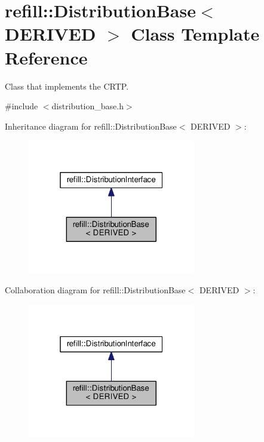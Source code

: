 \hypertarget{classrefill_1_1DistributionBase}{}\section{refill\+:\+:Distribution\+Base$<$ D\+E\+R\+I\+V\+ED $>$ Class Template Reference}
\label{classrefill_1_1DistributionBase}


Class that implements the C\+R\+TP.  




{\ttfamily \#include $<$distribution\+\_\+base.\+h$>$}



Inheritance diagram for refill\+:\+:Distribution\+Base$<$ D\+E\+R\+I\+V\+ED $>$\+:\nopagebreak
\begin{figure}[H]
\begin{center}
\leavevmode
\includegraphics[width=208pt]{classrefill_1_1DistributionBase__inherit__graph}
\end{center}
\end{figure}


Collaboration diagram for refill\+:\+:Distribution\+Base$<$ D\+E\+R\+I\+V\+ED $>$\+:\nopagebreak
\begin{figure}[H]
\begin{center}
\leavevmode
\includegraphics[width=208pt]{classrefill_1_1DistributionBase__coll__graph}
\end{center}
\end{figure}
